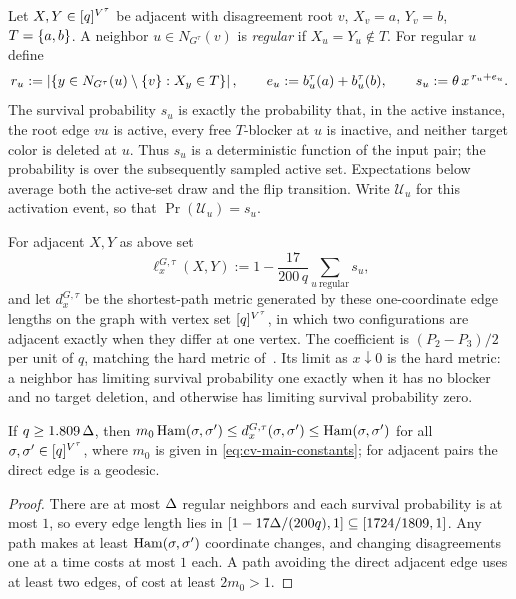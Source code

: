 Let \(X,Y\in[q]^{V^\tau}\) be adjacent with disagreement root \(v\),
\(X_v=a\), \(Y_v=b\),
$T=\left\{a,b\right\}$. A neighbor $u\in N_{G^\tau}(v)$ is \emph{regular} if
$X_u=Y_u\notin T$. For regular $u$ define
\begin{equation}\label{eq:cv-scores}
  r_u:=\left|\left\{y\in N_{G^\tau}(u)\setminus\left\{v\right\}:X_y\in T\right\}\right|,\qquad
  e_u:=b_u^\tau(a)+b_u^\tau(b),\qquad
  s_u:=\theta\,x^{\,r_u+e_u}.
\end{equation}
The survival probability $s_u$ is exactly the probability that, in the
active instance,
the root edge $vu$ is active, every free $T$-blocker at $u$ is inactive,
and neither target color is deleted at $u$.  Thus $s_u$ is a
deterministic function of the input pair; the probability is
over the subsequently sampled active set. Expectations below average both the
active-set draw and the flip transition.
Write \(\mathcal U_u\) for this activation event, so that
\(\Pr(\mathcal U_u)=s_u\).

\begin{definition}\label{def:cv-metric}
For adjacent $X,Y$ as above set
\begin{equation}\label{eq:cv-edge-length}
  \ell_x^{G,\tau}(X,Y):=1-\frac{17}{200\,q}\sum_{u\ \text{regular}}s_u ,
\end{equation}
and let $d_x^{G,\tau}$ be the shortest-path metric generated by these
one-coordinate edge lengths on the graph with vertex set
\([q]^{V^\tau}\), in which two configurations are adjacent exactly when
they differ at one vertex. The
coefficient is $(P_2-P_3)/2$ per unit of $q$, matching the hard metric
of~\cite[Eq.~(2)]{CarlsonVigoda2024}. Its limit as $x\downarrow0$ is the
hard metric: a neighbor has limiting survival probability one exactly when it has no blocker
and no target deletion, and otherwise has limiting survival probability zero.
\end{definition}

\begin{lemma}\label{lem:cv-metric}
If $q\ge1.809\,\Delta$, then
$m_0\operatorname{Ham}(\sigma,\sigma')\le d_x^{G,\tau}(\sigma,\sigma')\le\operatorname{Ham}(\sigma,\sigma')$ for
all \(\sigma,\sigma'\in[q]^{V^\tau}\), where \(m_0\) is given in
\eqref{eq:cv-main-constants}; for adjacent pairs the direct edge is a geodesic.
\end{lemma}

\begin{proof}
There are at most $\Delta$ regular neighbors and each survival probability is at most $1$,
so every edge length lies in
$[1-17\Delta/(200q),1]\subseteq[1724/1809,1]$. Any path makes at least
$\operatorname{Ham}(\sigma,\sigma')$ coordinate changes, and changing disagreements one at a
time costs at most $1$ each. A path avoiding the direct adjacent edge uses
at least two edges, of cost at least $2m_0>1$.
\end{proof}

